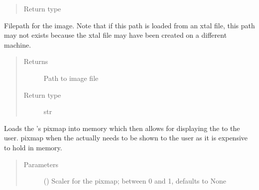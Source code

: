 \documentclass[letterpaper,10pt,english]{sphinxmanual}
\begin{document}
\begin{fulllineitems}
\begin{fulllineitems}
\begin{quote}
\begin{description}
\item[{Return type}] \leavevmode
{\hyperref[\detokenize{polo.crystallography:polo.crystallography.image.Image}]{}}

\end{description}\end{quote}

\end{fulllineitems}


\begin{fulllineitems}
\label{\detokenize{polo.crystallography:polo.crystallography.image.Image.path}}
Filepath for the image. Note that if this path is loaded
from an xtal file, this path may not exists because the xtal
file may have been created on a different machine.
\begin{quote}\begin{description}
\item[{Returns}] \leavevmode
Path to image file

\item[{Return type}] \leavevmode
str

\end{description}\end{quote}

\end{fulllineitems}


\begin{fulllineitems}
\label{\detokenize{polo.crystallography:polo.crystallography.image.Image.setPixmap}}
Loads the {\hyperref[\detokenize{polo.crystallography:polo.crystallography.image.Image}]{}}’s 
pixmap into memory which then allows for displaying
the {\hyperref[\detokenize{polo.crystallography:polo.crystallography.image.Image}]{}} to the user. 
 pixmap when
the {\hyperref[\detokenize{polo.crystallography:polo.crystallography.image.Image}]{}} actually
needs to be shown to the user as it is expensive
to hold in memory.
\begin{quote}\begin{description}
\item[{Parameters}] \leavevmode
{} (\sphinxstyleliteralemphasis{\sphinxupquote{, }}) \textendash{} Scaler for the pixmap; between 0 and 1, defaults to None


\end{description}
\end{quote}
\end{fulllineitems}
\end{fulllineitems}
\end{document}
